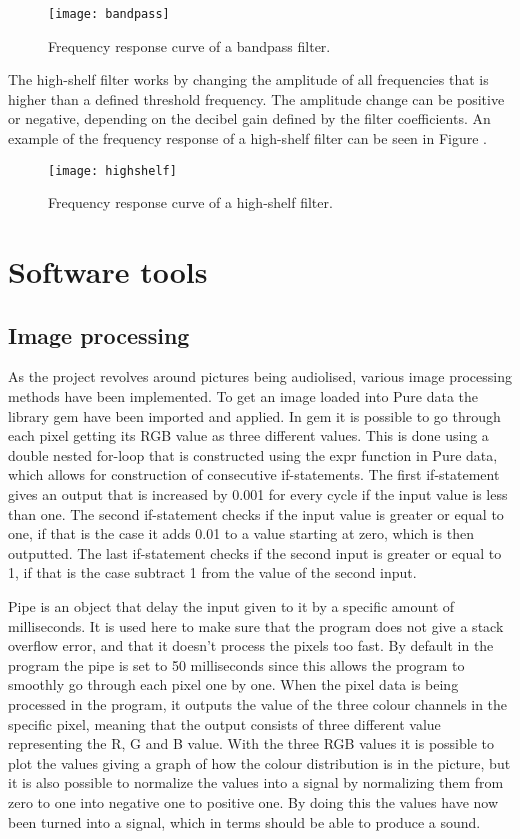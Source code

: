 \begin{figure}
\centering
\texttt{[image: bandpass]}
\caption{Frequency response curve of a bandpass filter.}
\label{fig:bandpass}
\end{figure}

The high-shelf filter works by changing the amplitude of all frequencies that is higher than a defined threshold frequency. The amplitude change can be positive or negative, depending on the decibel gain defined by the filter coefficients\cite{zolzer2011dafx}. An example of the frequency response of a high-shelf filter can be seen in Figure .

\begin{figure}
\centering
\texttt{[image: highshelf]}
\caption{Frequency response curve of a high-shelf filter.}
\label{fig:highshelf}
\end{figure}

\section{Software tools}\label{sec:softwareTools}
	\subsection{Image processing}\label{sub:imageprocessing}
	As the project revolves around pictures being audiolised, various image processing methods have been implemented. To get an image loaded into Pure data the library gem have been imported and applied. In gem it is possible to go through each pixel getting its RGB value as three different values. This is done using a double nested for-loop that is constructed using the expr function in Pure data, which allows for construction of consecutive if-statements. The first if-statement gives an output that is increased by 0.001 for every cycle if the input value is less than one. The second if-statement checks if the input value is greater or equal to one, if that is the case it adds 0.01 to a value starting at zero, which is then outputted. The last if-statement checks if the second input is greater or equal to 1, if that is the case subtract 1 from the value of the second input.
	
	Pipe is an object that delay the input given to it by a specific amount of milliseconds. It is used here to make sure that the program does not give a stack overflow error, and that it doesn't process the pixels too fast. By default in the program the pipe is set to 50 milliseconds since this allows the program to smoothly go through each pixel one by one. 
	When the pixel data is being processed in the program, it outputs the value of the three colour channels in the specific pixel, meaning that the output consists of three different value representing the R, G and B value. With the three RGB values it is possible to plot the values giving a graph of how the colour distribution is in the picture, but it is also possible to normalize the values into a signal by normalizing them from zero to one into negative one to positive one. By doing this the values have now been turned into a signal, which in terms should be able to produce a sound.


